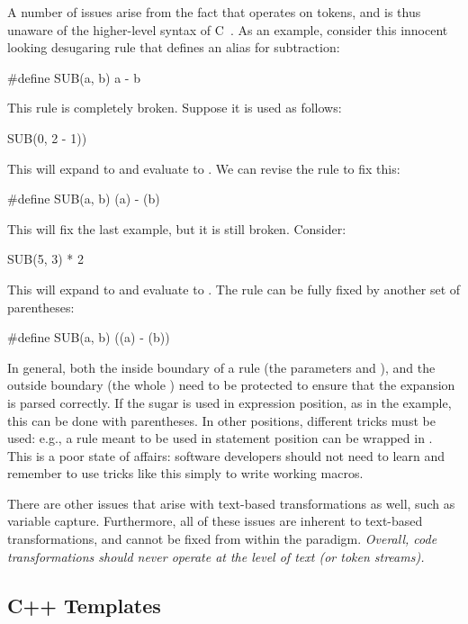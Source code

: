 A number of issues arise from the fact that  operates on tokens, and
is thus unaware of the higher-level syntax of C~\cite{c-standard}.
As an example, consider this innocent looking
 desugaring rule that defines an alias for subtraction:
\begin{Codes}
  #define SUB(a, b) a - b
\end{Codes}
This rule is completely broken. Suppose it is used as follows:
\begin{Codes}
  SUB(0, 2 - 1))
\end{Codes}
This will expand to  and evaluate to .
We can revise the rule to fix this:
\begin{Codes}
  #define SUB(a, b) (a) - (b)
\end{Codes}
This will fix the last example, but it is still broken. Consider:
\begin{Codes}
  SUB(5, 3) * 2
\end{Codes}
This will expand to  and evaluate to .
The rule can be fully fixed by another set of parentheses:
\begin{Codes}
  #define SUB(a, b) ((a) - (b))
\end{Codes}
In general, both the inside boundary of a rule (the parameters 
and ), and the outside boundary (the whole ) need
to be protected to ensure that the expansion is parsed correctly. If
the sugar is used in expression position, as in the 
example, this can be done with parentheses. In other positions,
different tricks must be used: e.g., a rule meant to be used in
statement position can be wrapped in .
This is a poor state of affairs: software developers should not need
to learn and remember to use tricks like this simply to write working
macros.

There are other issues that arise with text-based transformations as
well, such as variable capture. Furthermore, all of these issues are
inherent to text-based transformations, and cannot be
fixed from within the paradigm. \emph{Overall, code transformations
  should never operate at the level of text (or token streams).}

\subsection{C++ Templates} \label{sec:taxonomy-cpp}

